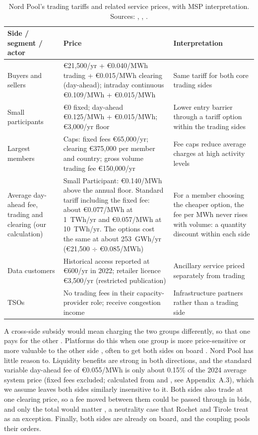 \begin{table}[ht]
\centering
\small
\caption{Nord Pool's trading tariffs and related service prices, with MSP interpretation. Sources: \citet{NPFees2026}, \citet{ERR2022}, \citet{NPData}.}
\label{tab:pricing}
\begin{tabularx}{\textwidth}{L{3.0cm} L{5.4cm} Y}
\toprule
\textbf{Side / segment / actor} & \textbf{Price} & \textbf{Interpretation} \\
\midrule
Buyers and sellers & €21,500/yr + €0.040/MWh trading + €0.015/MWh clearing (day-ahead); intraday continuous €0.109/MWh + €0.015/MWh & Same tariff for both core trading sides \\
Small participants & €0 fixed; day-ahead €0.125/MWh + €0.015/MWh; €3,000/yr floor & Lower entry barrier through a tariff option within the trading sides \\
Largest members & Caps: fixed fees €65,000/yr; clearing €375,000 per member and country; gross volume trading fee €150,000/yr & Fee caps reduce average charges at high activity levels \\
Average day-ahead fee, trading and clearing (our calculation) & Small Participant: €0.140/MWh above the annual floor. Standard tariff including the fixed fee: about €0.077/MWh at 1~TWh/yr and €0.057/MWh at 10~TWh/yr. The options cost the same at about 253~GWh/yr (€21,500 $\div$ €0.085/MWh) & For a member choosing the cheaper option, the fee per MWh never rises with volume: a quantity discount within each side \\
Data customers & Historical access reported at €600/yr in 2022; retailer licence €3,500/yr (restricted publication) & Ancillary service priced separately from trading \\
TSOs & No trading fees in their capacity-provider role; receive congestion income & Infrastructure partners rather than a trading side \\
\bottomrule
\end{tabularx}
\end{table}

A cross-side subsidy would mean charging the two groups differently, so that one pays for the other \citep[Section~10.2.2]{OverbyAudestad2021}. Platforms do this when one group is more price-sensitive or more valuable to the other side \citep[p.~673]{Armstrong2006}, often to get both sides on board \citep[pp.~990--991]{RochetTirole2003}. Nord Pool has little reason to. Liquidity benefits are strong in both directions, and the standard variable day-ahead fee of €0.055/MWh is only about 0.15\% of the 2024 average system price (fixed fees excluded; calculated from \citealp{NPFees2026} and \citealp{NP2024}, see Appendix~A.3), which we assume leaves both sides similarly insensitive to it. Both sides also trade at one clearing price, so a fee moved between them could be passed through in bids, and only the total would matter \citep[pp.~1017--1018]{RochetTirole2003}, a neutrality case that Rochet and Tirole treat as an exception. Finally, both sides are already on board, and the coupling pools their orders.


